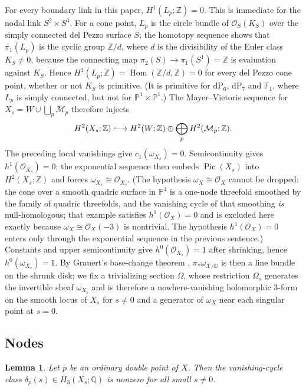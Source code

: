 \documentclass[11pt]{amsart}
\newtheorem{lemma}[theorem]{Lemma}
\theoremstyle{definition}
\theoremstyle{remark}
\theoremstyle{plain}
\newcommand{\ZZ}{\mathbb{Z}}
\newcommand{\QQ}{\mathbb{Q}}
\newcommand{\PP}{\mathbb{P}}
\newcommand{\cO}{\mathcal{O}}
\newcommand{\Mil}{\mathcal{M}}  %
\newcommand{\cX}{\mathcal{X}}
\newcommand{\Pic}{\operatorname{Pic}}
\newcommand{\dP}{\mathrm{dP}}
\newcommand{\Disk}{\mathbb{D}}
\begin{document}
For every boundary link in this paper, $H^1(L_p;\ZZ)=0$.  This is
immediate for the nodal link $S^2\times S^3$.  For a cone point, $L_p$
is the circle bundle of $\cO_S(K_S)$ over the simply connected del
Pezzo surface $S$; the homotopy sequence shows that $\pi_1(L_p)$ is
the cyclic group $\ZZ/d$, where $d$ is the divisibility of the Euler
class $K_S\neq0$, because the connecting map
$\pi_2(S)\to\pi_1(S^1)=\ZZ$ is evaluation against $K_S$.  Hence
$H^1(L_p;\ZZ)=\operatorname{Hom}(\ZZ/d,\ZZ)=0$ for every del Pezzo
cone point, whether or not $K_S$ is primitive.  (It is primitive for
$\dP_6$, $\dP_7$ and $\mathbb F_1$, where $L_p$ is simply connected,
but not for $\PP^1\times\PP^1$.)  The Mayer--Vietoris
sequence for $X_s=W\cup\bigsqcup_p\Mil_p$ therefore injects
\[
 H^2(X_s;\ZZ)\lhook\joinrel\longrightarrow
 H^2(W;\ZZ)\oplus\bigoplus_pH^2(\Mil_p;\ZZ).
\]
The preceding local vanishings give $c_1(\omega_{X_s})=0$.
Semicontinuity gives $h^1(\cO_{X_s})=0$; the exponential sequence then
embeds $\Pic(X_s)$ into $H^2(X_s;\ZZ)$ and forces
$\omega_{X_s}\cong\cO_{X_s}$.  (The hypothesis
$\omega_X\cong\cO_X$ cannot be dropped: the cone over a smooth quadric
surface in $\PP^4$ is a one-node threefold smoothed by the family of
quadric threefolds, and the vanishing cycle of that smoothing
\emph{is} null-homologous; that example satisfies $h^1(\cO_X)=0$ and
is excluded here exactly because $\omega_X\cong\cO_X(-3)$ is
nontrivial.  The hypothesis $h^1(\cO_X)=0$ enters only through the
exponential sequence in the previous sentence.)  Constants and upper
semicontinuity give $h^0(\cO_{X_s})=1$ after shrinking, hence
$h^0(\omega_{X_s})=1$.  By Grauert's base-change theorem
\cite{Grauert60}, $\pi_*\omega_{\cX/\Disk}$ is then a line bundle on the shrunk
disk; we fix a trivializing section $\Omega$, whose restriction
$\Omega_s$ generates the invertible sheaf $\omega_{X_s}$ and is
therefore a nowhere-vanishing holomorphic $3$-form on the smooth locus
of $X_s$ for $s\neq0$ and a generator of $\omega_X$ near each singular point at
$s=0$.

\subsection{Nodes}\label{sec:nodeperiod}
\begin{lemma}\label{lem:P}
Let $p$ be an ordinary double point of $X$.  Then the vanishing-cycle
class $\delta_p(s)\in H_3(X_s;\QQ)$ is nonzero for all small
$s\neq0$.
\end{lemma}
\end{document}
